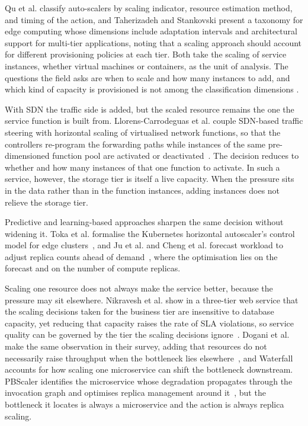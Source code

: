 ﻿\documentclass[12pt,reqno,twoside]{amsbook}
\begin{document}
Qu et al. classify auto-scalers by scaling indicator, resource estimation method,
and timing of the action, and Taherizadeh and Stankovski present a taxonomy for
edge computing whose dimensions include adaptation intervals and architectural
support for multi-tier applications, noting that a scaling approach should
account for different provisioning policies at each tier. Both take the scaling
of service instances, whether virtual machines or containers, as the unit of
analysis. The questions the field asks are when to scale and how many instances
to add, and which kind of capacity is provisioned is not among the classification
dimensions
\parencite{Qu2018AutoScalingWebApplicationsClouds,Taherizadeh2017AutoScalingApplicationsEdgeComputing}.

With SDN the traffic side is added, but the scaled resource remains the one the
service function is built from. Llorens-Carrodeguas et al. couple SDN-based
traffic steering with horizontal scaling of virtualised network functions, so
that the controllers re-program the forwarding paths while instances of the same
pre-dimensioned function pool are activated or
deactivated~\parencite{Llorens2021SDNBasedHorizontalAutoScalingLoadBalancing}.
The decision reduces to whether and how many instances of that one function to
activate. In such a service, however, the storage tier is itself a live capacity.
When the pressure sits in the data rather than in the function instances, adding
instances does not relieve the storage tier.

Predictive and learning-based approaches sharpen the same decision without
widening it. Toka et al. formalise the Kubernetes horizontal autoscaler's control
model for edge
clusters~\parencite{Toka2021MachineLearningScalingManagementKubernetes}, and Ju
et al. and Cheng et al. forecast workload to adjust replica counts ahead of
demand~\parencite{Ju2021ProactiveAutoscalingEdgeComputingSystems,Cheng2023ProScaleProactiveAutoscalingMicroserviceTime},
where the optimisation lies on the forecast and on the number of compute
replicas.

Scaling one resource does not always make the service better, because the
pressure may sit elsewhere. Nikravesh et al. show in a three-tier web service
that the scaling decisions taken for the business tier are insensitive to
database capacity, yet reducing that capacity raises the rate of SLA violations,
so service quality can be governed by the tier the scaling decisions
ignore~\parencite{Nikravesh2017ImpactDatabaseLayerAutoScaling}. Dogani et al.
make the same observation in their survey, adding that resources do not
necessarily raise throughput when the bottleneck lies
elsewhere~\parencite{Dogani2023AutoScalingTechniquesContainerCloud}, and
Waterfall accounts for how scaling one microservice can shift the bottleneck
downstream. PBScaler identifies the microservice whose degradation propagates
through the invocation graph and optimises replica management around
it~\parencite{Xie2024PBScalerBottleneckAwareAutoscalingFramework}, but the
bottleneck it locates is always a microservice and the action is always replica
scaling.
\end{document}
